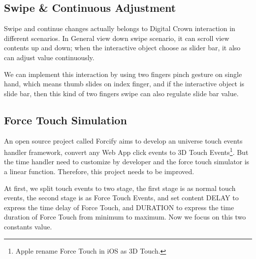 \subsection{Swipe \& Continuous Adjustment}

Swipe and continue changes actually belongs to Digital Crown interaction in different scenarios. In General view down swipe scenario, it can scroll view contents up and down; when the interactive object choose as slider bar, it also can adjust value continuously.

We can implement this interaction by using two fingers pinch gesture on single hand, which means thumb slides on index finger, and if the interactive object is slide bar, then this kind of two fingers swipe can also regulate slide bar value.

\subsection{Force Touch Simulation}
\label{sub:force-touch-simu}

An open source project called Forcify\cite{Huxpro:2016ua} aims to develop an universe touch events handler framework, convert any Web App click events to 3D Touch Events\footnote{Apple rename Force Touch in iOS as 3D Touch.}. But the time handler need to customize by developer and the force touch simulator is a linear function. Therefore, this project needs to be improved.

At first, we split touch events to two stage, the first stage is as normal touch events, the second stage is as Force Touch Events, and set content DELAY to express the time delay of Force Touch, and DURATION to express the time duration of Force Touch from minimum to maximum.
Now we focus on this two constants value.


